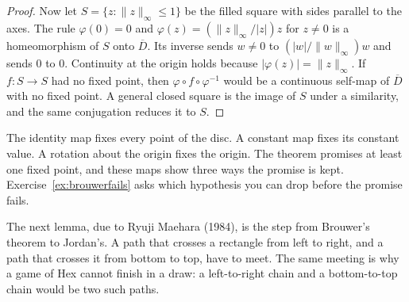 \begin{proof}
Now let $S=\{z:\|z\|_\infty\le1\}$ be the filled square with sides parallel to the axes. The rule $\varphi(0)=0$ and $\varphi(z)=(\|z\|_\infty/|z|)z$ for $z\ne0$ is a homeomorphism of $S$ onto $\overline D$. Its inverse sends $w\ne0$ to $(|w|/\|w\|_\infty)w$ and sends $0$ to $0$. Continuity at the origin holds because $|\varphi(z)|=\|z\|_\infty$. If $f:S\to S$ had no fixed point, then $\varphi\circ f\circ\varphi^{-1}$ would be a continuous self-map of $\overline D$ with no fixed point. A general closed square is the image of $S$ under a similarity, and the same conjugation reduces it to $S$.
\end{proof}

The identity map fixes every point of the disc. A constant map fixes its constant value. A rotation about the origin fixes the origin. The theorem promises at least one fixed point, and these maps show three ways the promise is kept. Exercise~\ref{ex:brouwerfails} asks which hypothesis you can drop before the promise fails.

The next lemma, due to Ryuji Maehara (1984), is the step from Brouwer's theorem to Jordan's. A path that crosses a rectangle from left to right, and a path that crosses it from bottom to top, have to meet. The same meeting is why a game of Hex cannot finish in a draw: a left-to-right chain and a bottom-to-top chain would be two such paths.

